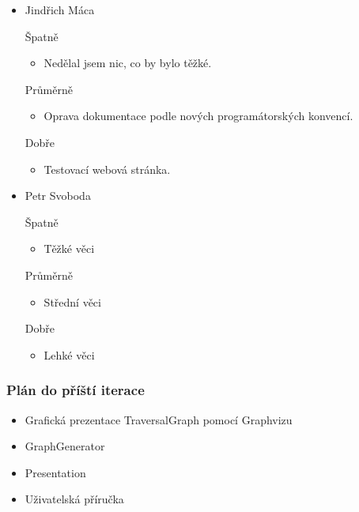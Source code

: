 \documentclass{beamer}
\begin{document}
\begin{frame}[allowframebreaks]
\begin{itemize}
    \item Jindřich Máca
      \begin{block}{Špatně} %
       \begin{itemize}
        \item Nedělal jsem nic, co by bylo těžké.
       \end{itemize}
     \end{block}
     \begin{block}{Průměrně} %
        \begin{itemize}
         \item Oprava dokumentace podle nových programátorských konvencí.
       \end{itemize}
     \end{block}
     \begin{block}{Dobře} %
       \begin{itemize}
        \item Testovací webová stránka.
       \end{itemize}
     \end{block}
   
    \item Petr Svoboda
      \begin{block}{Špatně} %
       \begin{itemize}
        \item Těžké věci
       \end{itemize}
     \end{block}
     \begin{block}{Průměrně} %
        \begin{itemize}
        \item Střední věci
       \end{itemize}
     \end{block}
     \begin{block}{Dobře} %
       \begin{itemize}
        \item Lehké věci
       \end{itemize}
     \end{block}
   \end{itemize}
\end{frame}

\begin{frame}[allowframebreaks]\frametitle{Plán do příští iterace}
  \begin{itemize}
		\item Grafická prezentace TraversalGraph pomocí Graphvizu
		\item GraphGenerator
		\item Presentation
		\item Uživatelská příručka
  \end{itemize}
\end{frame}
\end{document}
